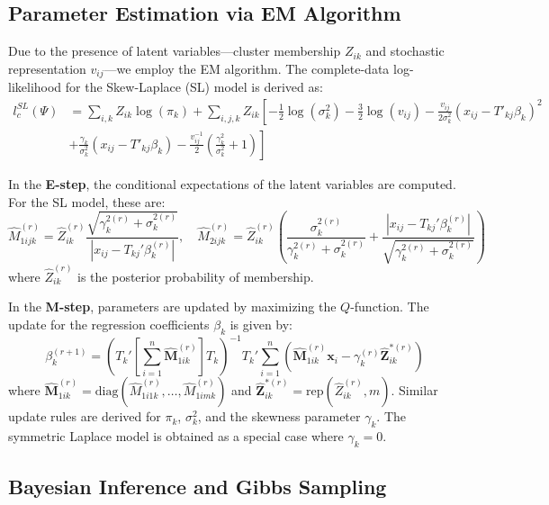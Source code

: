 \documentclass[twoside]{article}
\begin{document}
\subsection{Parameter Estimation via EM Algorithm}
Due to the presence of latent variables—cluster membership $Z_{ik}$ and stochastic representation $v_{ij}$—we employ the EM algorithm. The complete-data log-likelihood for the Skew-Laplace (SL) model is derived as:
\begin{align}\label{log_like_SL}
l_c^{SL} (\Psi) &= \sum_{i,k} Z_{ik} \log(\pi_k) + \sum_{i,j,k} Z_{ik} \left[ -\frac{1}{2} \log(\sigma_k^2) - \frac{3}{2} \log(v_{ij}) - \frac{v_{ij}}{2\sigma_k^2} (x_{ij} - T'_{kj}\beta_k)^2 \right. \nonumber \\
&\left. + \frac{\gamma_k}{\sigma_k^2}(x_{ij} - T'_{kj}\beta_k) - \frac{v_{ij}^{-1}}{2} \left( \frac{\gamma_k^2}{\sigma_k^2} + 1 \right) \right]
\end{align}

In the \textbf{E-step}, the conditional expectations of the latent variables are computed. For the SL model, these are:
\begin{equation}
\hat{M}_{1ijk}^{(r)} = \hat{Z}_{ik}^{(r)} \frac{\sqrt{\gamma_k^{2(r)} + \sigma_k^{2(r)}}}{|x_{ij} - T_{kj}' \beta_k^{(r)}|}, \quad \hat{M}_{2ijk}^{(r)} = \hat{Z}_{ik}^{(r)} \left( \frac{\sigma_k^{2(r)}}{\gamma_k^{2(r)} + \sigma_k^{2(r)}} + \frac{|x_{ij} - T_{kj}' \beta_k^{(r)}|}{\sqrt{\gamma_k^{2(r)} + \sigma_k^{2(r)}}} \right)
\end{equation}
where $\hat{Z}_{ik}^{(r)}$ is the posterior probability of membership.

In the \textbf{M-step}, parameters are updated by maximizing the $Q$-function. The update for the regression coefficients $\beta_k$ is given by:
\begin{equation}
\beta_k^{(r+1)} = \left( T_k' \left[ \sum_{i=1}^n \hat{\mathbf{M}}_{1ik}^{(r)} \right] T_k \right)^{-1} T_k' \sum_{i=1}^n \left( \hat{\mathbf{M}}_{1ik}^{(r)} \mathbf{x}_i - \gamma_k^{(r)} \hat{\mathbf{Z}}_{ik}^{*(r)} \right)
\end{equation}
where $\hat{\mathbf{M}}_{1ik}^{(r)} = \text{diag}(\hat{M}_{1i1k}^{(r)}, \dots, \hat{M}_{1imk}^{(r)})$ and $\hat{\mathbf{Z}}_{ik}^{*(r)} = \text{rep}(\hat{Z}_{ik}^{(r)}, m)$. Similar update rules are derived for $\pi_k$, $\sigma_k^2$, and the skewness parameter $\gamma_k$. The symmetric Laplace model is obtained as a special case where $\gamma_k=0$.

\subsection{Bayesian Inference and Gibbs Sampling}
\end{document}
